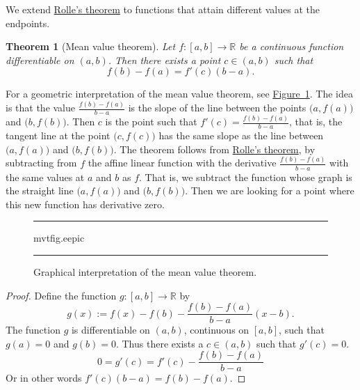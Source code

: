 \documentclass[12pt]{book}
\newenvironment{myfigureht}{%
\begin{figure}[h!t]
\noindent\rule{\textwidth}{0.4pt}\vspace{12pt}\par\centering}%
{\par\noindent\rule{\textwidth}{0.4pt}
\end{figure}}
\newcommand{\R}{{\mathbb{R}}}
\theoremstyle{plain}
\newtheorem{thm}{Theorem}[section]
\theoremstyle{remark}
\theoremstyle{definition}
\theoremstyle{exercise}
\theoremstyle{example}
\newcommand{\figureref}[1]{\hyperref[#1]{Figure~\ref*{#1}}}
\begin{document}
We extend \hyperref[thm:rolle]{Rolle's theorem}
to functions that attain different
values at the endpoints.

\begin{thm}[Mean value theorem] \label{thm:mvt}
Let $f \colon [a,b] \to \R$ be a continuous function
differentiable on $(a,b)$.  Then there exists a point $c \in (a,b)$
such that
\begin{equation*}
f(b)-f(a) = f'(c)(b-a) .
\end{equation*}
\end{thm}

For a geometric interpretation of the mean value theorem, see
\figureref{mvtfig}.  The idea is that the value $\frac{f(b)-f(a)}{b-a}$
is the slope of the line between the points $\bigl(a,f(a)\bigr)$
and $\bigl(b,f(b)\bigr)$.
Then $c$ is the point such that $f'(c) = \frac{f(b)-f(a)}{b-a}$, that 
is, the tangent line at the point $\bigl(c,f(c)\bigr)$ has the same slope as the
line between $\bigl(a,f(a)\bigr)$ and $\bigl(b,f(b)\bigr)$.
The theorem follows from \hyperref[thm:rolle]{Rolle's theorem},
by subtracting from $f$ the affine linear function with the derivative
$\frac{f(b)-f(a)}{b-a}$ with the same values at $a$ and $b$ as $f$.
That is, we subtract the function whose graph is the straight line
$\bigl(a,f(a)\bigr)$ and $\bigl(b,f(b)\bigr)$.
Then we are looking for a point where this new
function has derivative zero.

\begin{myfigureht}
{mvtfig.eepic}
\caption{Graphical interpretation of the mean value theorem.\label{mvtfig}}
\end{myfigureht}


\begin{proof}
Define the
function $g \colon [a,b] \to \R$ by
\begin{equation*}
g(x) := f(x)-f(b)-\frac{f(b)-f(a)}{b-a}(x-b) .
\end{equation*}
The function $g$ is differentiable on $(a,b)$,
continuous on $[a,b]$, such that $g(a) = 0$ and $g(b) = 0$.  Thus there exists
a
$c \in (a,b)$ such that $g'(c) = 0$.
\begin{equation*}
0 = g'(c) = f'(c)-\frac{f(b)-f(a)}{b-a}
\end{equation*}
Or in other words
$f'(c)(b-a) = f(b)-f(a)$.
\end{proof}
\end{document}
